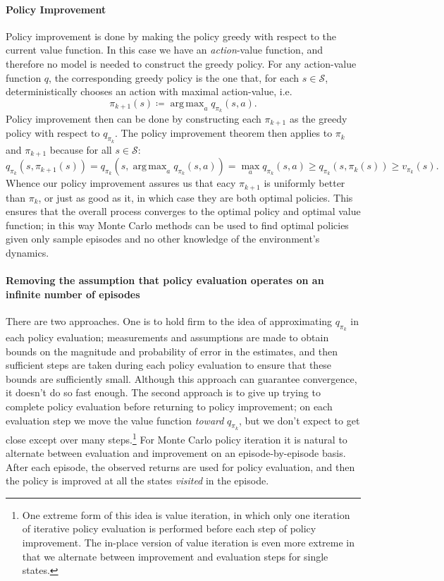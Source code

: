 \documentclass[12pt]{article}
\DeclareMathOperator*{\argmax}{arg\,max}
\begin{document}
\paragraph{Policy Improvement} Policy improvement is done by making the policy greedy with respect to the current value function. In this case we have an \emph{action}-value function, and therefore no model is needed to construct the greedy policy. For any action-value function $q$, the corresponding greedy policy is the one that, for each $s \in \mathcal S$, deterministically chooses an action with maximal action-value, i.e.
\[
  \pi_{k+1}(s) \coloneqq \argmax_a q_{\pi_k}(s,a).
\]
Policy improvement then can be done by constructing each $\pi_{k+1}$ as the greedy policy with respect to $q_{\pi_k}$.
The policy improvement theorem then applies to $\pi_k$ and $\pi_{k+1}$ because for all $s \in \mathcal S$:
\[
  q_{\pi_k}(s, \pi_{k+1}(s)) = q_{\pi_k}(s, \argmax_a q_{\pi_k}(s,a)) = \max_a q_{\pi_k} (s,a) \geq q_{\pi_k}(s, \pi_k(s)) \geq v_{\pi_k}(s).
\]
Whence our policy improvement assures us that eacy $\pi_{k+1}$ is uniformly better than $\pi_k$, or just as good as it, in which case they are both optimal policies. This ensures that the overall process converges to the optimal policy and optimal value function; in this way Monte Carlo methods can be used to find optimal policies given only sample episodes and no other knowledge of the environment's dynamics.

\paragraph{Removing the assumption that policy evaluation operates on an infinite number of episodes} There are two approaches. One is to hold firm to the idea of approximating $q_{\pi_k}$ in each policy evaluation; measurements and assumptions are made to obtain bounds on the magnitude and probability of error in the estimates, and then sufficient steps are taken during each policy evaluation to ensure that these bounds are sufficiently small. Although this approach can guarantee convergence, it doesn't do so fast enough. The second approach is to give up trying to complete policy evaluation before returning to policy improvement; on each evaluation step we move the value function \emph{toward} $q_{\pi_k}$, but we don't expect to get close except over many steps.\footnote{One extreme form of this idea is value iteration, in which only one iteration of iterative policy evaluation is performed before each step of policy improvement. The in-place version of value iteration is even more extreme in that we alternate between improvement and evaluation steps for single states.} For Monte Carlo policy iteration it is natural to alternate between evaluation and improvement on an episode-by-episode basis. After each episode, the observed returns are used for policy evaluation, and then the policy is improved at all the states \emph{visited} in the episode.
\end{document}
